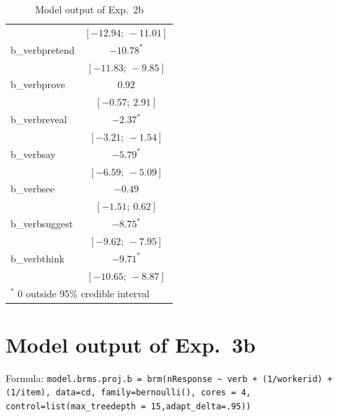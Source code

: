 \documentclass[11pt,fleqn]{article}
\newcommand{\6}{\mbox{$[\hspace*{-.6mm}[$}}
\newcommand{\9}{\mbox{$]\hspace*{-.6mm}]$}}
\begin{document}
{\begin{table}
\begin{center}
\begin{tabular}{l c }
                   & $[-12.94;\ -11.01]$ \\
b\_verbpretend     & $-10.78^{*}$        \\
                   & $[-11.83;\ -9.85]$  \\
b\_verbprove       & $0.92$              \\
                   & $[-0.57;\ 2.91]$    \\
b\_verbreveal      & $-2.37^{*}$         \\
                   & $[-3.21;\ -1.54]$   \\
b\_verbsay         & $-5.79^{*}$         \\
                   & $[-6.59;\ -5.09]$   \\
b\_verbsee         & $-0.49$             \\
                   & $[-1.51;\ 0.62]$    \\
b\_verbsuggest     & $-8.75^{*}$         \\
                   & $[-9.62;\ -7.95]$   \\
b\_verbthink       & $-9.71^{*}$         \\
                   & $[-10.65;\ -8.87]$  \\
\hline
\multicolumn{2}{l}{\scriptsize{$^*$ 0 outside 95\% credible interval}}
\end{tabular}
\caption{Model output of Exp.~2b}
\label{table:coefficients}
\end{center}
\end{table}

\section{Model output of Exp.~3b}

Formula: \tiny \verb|model.brms.proj.b = brm(nResponse ~ verb + (1/workerid) + (1/item), data=cd, family=bernoulli(), cores = 4, control=list(max_treedepth = 15,adapt_delta=.95))| \normalsize


}
\end{document}
